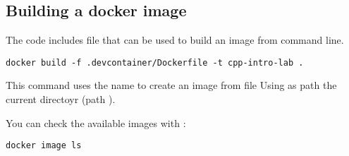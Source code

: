 \subsection{Building a docker image}

The code includes file  that can be used to build an image
from command line.

\begin{lstlisting}[style=terminal]
docker build -f .devcontainer/Dockerfile -t cpp-intro-lab .
\end{lstlisting}

This command uses the name
to create an image from file
Using as path the current directoyr (path ).

You can check the available images with :

\begin{lstlisting}[style=terminal]
docker image ls
\end{lstlisting}
